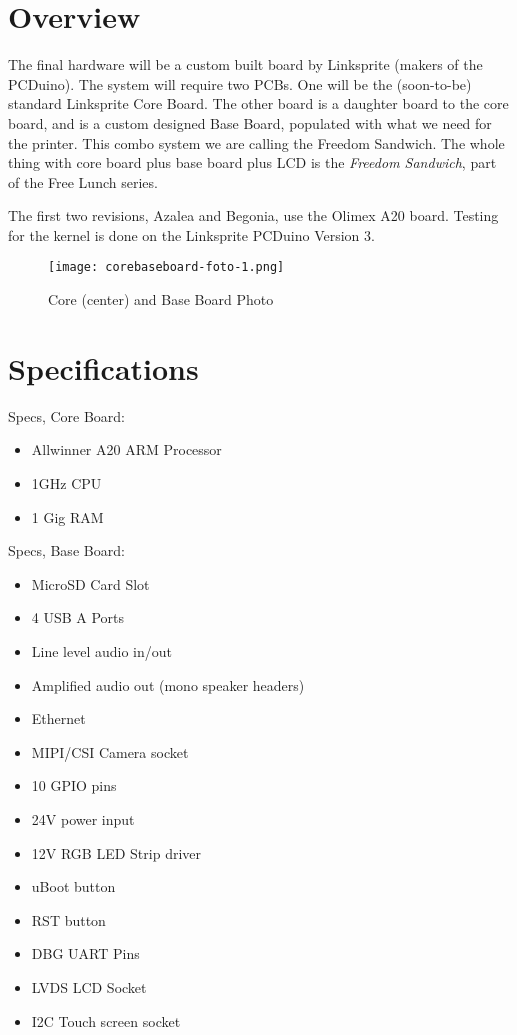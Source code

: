 %
%
%
%
%

\section{Overview}
The final hardware will be a custom built board by Linksprite (makers of the
PCDuino). The system will require two PCBs. One will be the (soon-to-be)
standard Linksprite Core Board. The other board is a daughter board to the
core board, and is a custom designed Base Board, populated with what we need
for the printer. This combo system we are calling the Freedom Sandwich. The whole thing
with core board plus base board plus LCD is the \emph{Freedom Sandwich}, part
of the Free Lunch series.

The first two revisions, Azalea and Begonia, use the Olimex A20 board. Testing
for the kernel is done on the Linksprite PCDuino Version 3.

\begin{figure}[H]
\centering
\texttt{[image: corebaseboard-foto-1.png]}
\caption{Core (center) and Base Board Photo}
\label{fig:bbfoto}
\end{figure}


\section{Specifications}
Specs, Core Board:

\begin{itemize}
  \item{Allwinner A20 ARM Processor}
  \item{1GHz CPU}
  \item{1 Gig RAM}
\end{itemize}

Specs, Base Board:
\begin{itemize}
  \item{MicroSD Card Slot}
  \item{4 USB A Ports}
  \item{Line level audio in/out}
  \item{Amplified audio out (mono speaker headers)}
  \item{Ethernet}
  \item{MIPI/CSI Camera socket}
  \item{10 GPIO pins}
  \item{24V power input}
  \item{12V RGB LED Strip driver}
  \item{uBoot button}
  \item{RST button}
  \item{DBG UART Pins}
  \item{LVDS LCD Socket}
  \item{I2C Touch screen socket}
\end{itemize}

